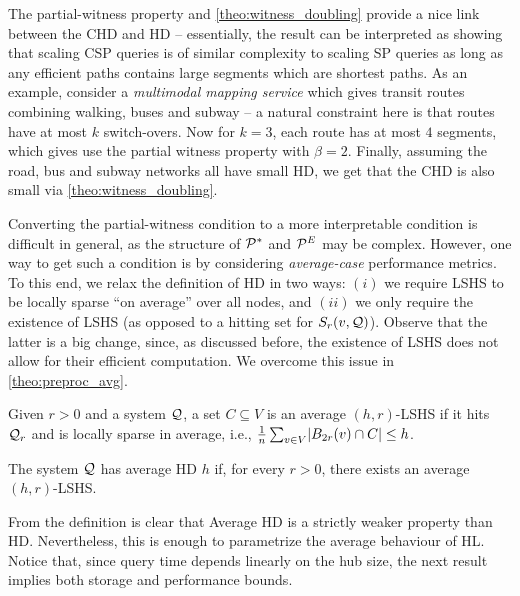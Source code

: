 The partial-witness property and \cref{theo:witness_doubling} provide a nice link between the CHD and HD -- essentially, the result can be interpreted as showing that scaling CSP queries is of similar complexity to scaling SP queries as long as any efficient paths contains large segments which are shortest paths. As an example, consider a \emph{multimodal mapping service} which gives transit routes combining walking, buses and subway -- a natural constraint here is that routes have at most $k$ switch-overs. Now for $k=3$, each route has at most $4$ segments, which gives use the partial witness property with $\beta = 2$. Finally, assuming the road, bus and subway networks all have small HD, we get that the CHD is also small via \cref{theo:witness_doubling}.


Converting the partial-witness condition to a more interpretable condition is difficult in general, as the structure of $\mathcal{P}^*$ and $\mathcal{P}^E$ may be complex. However, one way to get such a condition is by considering \emph{average-case} performance metrics.
To this end, we relax the definition of HD in two ways: $(i)$ we require LSHS to be locally sparse ``on average'' over all nodes, and
$(ii)$ we only require the existence of LSHS (as opposed to a hitting set for $S_r(v,\mathcal{Q})$).
Observe that the latter is a big change, since, as discussed before, the existence of LSHS does not allow for their efficient computation.
We overcome this issue in \cref{theo:preproc_avg}.

\begin{definition}
Given $r>0$ and a system $\mathcal{Q}$, a set $C\subseteq V$ is an average $(h,r)$-LSHS if it hits $\mathcal{Q}_r$ and is locally sparse in average, i.e.,
$\frac{1}{n}\sum_{v\in V} \lvert B_{2r}(v)\cap C\rvert \leq h$.
\end{definition}

\begin{definition}[Average HD]
The system $\mathcal{Q}$ has average HD $h$ if, for every $r>0$, there exists an average $(h,r)$-LSHS.
\end{definition}

From the definition is clear that Average HD is a strictly weaker property than HD.
Nevertheless, this is enough to parametrize the average behaviour of HL.
Notice that, since query time depends linearly on the hub size, the next result implies both storage and performance bounds.


